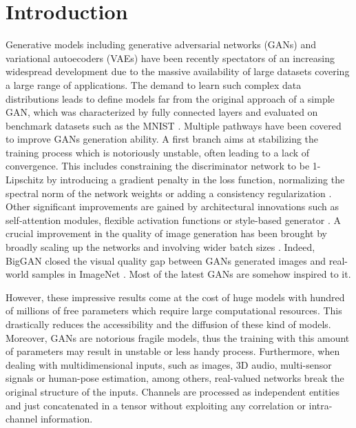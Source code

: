 \documentclass[graybox]{svmult}
\begin{document}
\section{Introduction}
\label{sec:intro}
\noindent Generative models including generative adversarial networks (GANs) \cite{GoodfellowNIPS2014} and variational autoecoders (VAEs) \cite{KingmaARXIV2014} have been recently spectators of an increasing widespread development due to the massive availability of large datasets covering a large range of applications. The demand to learn such complex data distributions leads to define models far from the original approach of a simple GAN, which was characterized by fully connected layers and evaluated on benchmark datasets such as the MNIST \cite{GoodfellowNIPS2014}. Multiple pathways have been covered to improve GANs generation ability. A first branch aims at stabilizing the training process which is notoriously unstable, often leading to a lack of convergence. This includes constraining the discriminator network to be 1-Lipschitz by introducing a gradient penalty in the loss function, normalizing the spectral norm of the network weights or adding a consistency regularization \cite{Arjovsky2017WassersteinG, GulrajaniNIPS2017, Miyato2018SpectralNF, ZhangConsRegGAN2020}. 
Other significant improvements are gained by architectural innovations such as self-attention modules, flexible activation functions or style-based generator \cite{KarrasStyleGen2019, GrassucciFlexGAN2021, ZhangSAGAN2019, KarrasPG2018}. A crucial improvement in the quality of image generation has been brought by broadly scaling up the networks and involving wider batch sizes \cite{Brock2019LargeSG, KarrasSG22020, schonfeld2021unet}. Indeed, BigGAN closed the visual quality gap between GANs generated images and real-world samples in ImageNet \cite{Brock2019LargeSG}. Most of the latest GANs are somehow inspired to it. 

However, these impressive results come at the cost of huge models with hundred of millions of free parameters which require large computational resources. This drastically reduces the accessibility and the diffusion of these kind of models. Moreover, GANs are notorious fragile models, thus the training with this amount of parameters may result in unstable or less handy process.
Furthermore, when dealing with multidimensional inputs, such as images, 3D audio, multi-sensor signals or human-pose estimation, among others, real-valued networks break the original structure of the inputs. Channels are processed as independent entities and just concatenated in a tensor without exploiting any correlation or intra-channel information.
\end{document}
